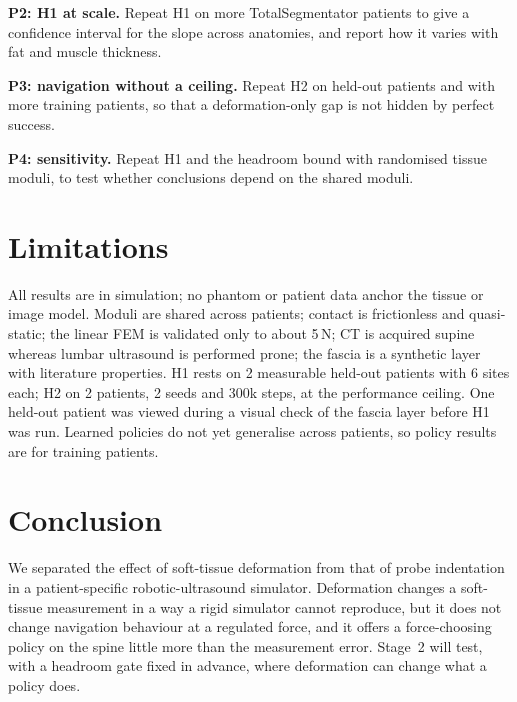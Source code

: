 \documentclass[conference]{IEEEtran}
\begin{document}
\textbf{P2: H1 at scale.} Repeat H1 on more TotalSegmentator patients to give a confidence interval for the slope
across anatomies, and report how it varies with fat and muscle thickness.

\textbf{P3: navigation without a ceiling.} Repeat H2 on held-out patients and with more training patients, so that a
deformation-only gap is not hidden by perfect success.

\textbf{P4: sensitivity.} Repeat H1 and the headroom bound with randomised tissue moduli, to test whether conclusions depend on the
shared moduli.

\section{Limitations}

All results are in simulation; no phantom or patient data anchor the tissue or image model. Moduli are shared across
patients; contact is frictionless and quasi-static; the linear FEM is validated only to about 5\,N; CT is acquired
supine whereas lumbar ultrasound is performed prone; the fascia is a synthetic layer with literature properties.
H1 rests on 2 measurable held-out patients with 6 sites each; H2 on 2 patients, 2 seeds and 300k steps, at the
performance ceiling. One held-out patient was viewed during a visual check of the fascia layer before H1 was run.
Learned policies do not yet generalise across patients, so policy results are for training patients.

\section{Conclusion}
We separated the effect of soft-tissue deformation from that of probe indentation in a patient-specific
robotic-ultrasound simulator. Deformation changes a soft-tissue measurement in a way a rigid simulator cannot
reproduce, but it does not change navigation behaviour at a regulated force, and it offers a force-choosing policy
on the spine little more than the measurement error. Stage~2 will test, with a headroom gate fixed in advance,
where deformation can change what a policy does.



\end{document}
